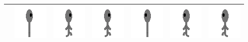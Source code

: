 \documentclass[../Main.tex]{subfiles}
\begin{document}
\begin{center}
\begin{tabular}{ | m{} | m{} m{} m{} m{} m{} m{} | }
                    & \centerline{\includegraphics[scale=3]{../res/textures/entities/followers/dark/East.png}} & \centerline{\includegraphics[scale=3]{../res/textures/entities/followers/dark/East-Walk-1.png}} & \centerline{\includegraphics[scale=3]{../res/textures/entities/followers/dark/East-Walk-2.png}} & \centerline{\includegraphics[scale=3]{../res/textures/entities/followers/dark/West.png}} & \centerline{\includegraphics[scale=3]{../res/textures/entities/followers/dark/West-Walk-1.png}} & \centerline{\includegraphics[scale=3]{../res/textures/entities/followers/dark/West-Walk-2.png}} \\
                    \hline
                \end{tabular}


\end{center}
\end{document}
